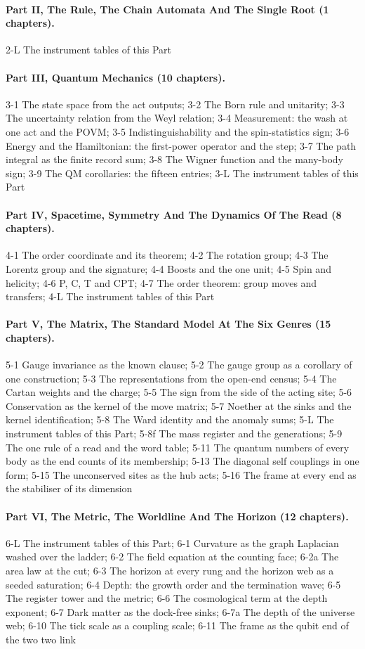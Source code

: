 \paragraph{Part II, The Rule, The Chain Automata And The Single Root (1 chapters).} 2-L The instrument tables of this Part
\paragraph{Part III, Quantum Mechanics (10 chapters).} 3-1 The state space from the act outputs; 3-2 The Born rule and unitarity; 3-3 The uncertainty relation from the Weyl relation; 3-4 Measurement: the wash at one act and the POVM; 3-5 Indistinguishability and the spin-statistics sign; 3-6 Energy and the Hamiltonian: the first-power operator and the step; 3-7 The path integral as the finite record sum; 3-8 The Wigner function and the many-body sign; 3-9 The QM corollaries: the fifteen entries; 3-L The instrument tables of this Part
\paragraph{Part IV, Spacetime, Symmetry And The Dynamics Of The Read (8 chapters).} 4-1 The order coordinate and its theorem; 4-2 The rotation group; 4-3 The Lorentz group and the signature; 4-4 Boosts and the one unit; 4-5 Spin and helicity; 4-6 P, C, T and CPT; 4-7 The order theorem: group moves and transfers; 4-L The instrument tables of this Part
\paragraph{Part V, The Matrix, The Standard Model At The Six Genres (15 chapters).} 5-1 Gauge invariance as the known clause; 5-2 The gauge group as a corollary of one construction; 5-3 The representations from the open-end census; 5-4 The Cartan weights and the charge; 5-5 The sign from the side of the acting site; 5-6 Conservation as the kernel of the move matrix; 5-7 Noether at the sinks and the kernel identification; 5-8 The Ward identity and the anomaly sums; 5-L The instrument tables of this Part; 5-8f The mass register and the generations; 5-9 The one rule of a read and the word table; 5-11 The quantum numbers of every body as the end counts of its membership; 5-13 The diagonal self couplings in one form; 5-15 The unconserved sites as the hub acts; 5-16 The frame at every end as the stabiliser of its dimension
\paragraph{Part VI, The Metric, The Worldline And The Horizon (12 chapters).} 6-L The instrument tables of this Part; 6-1 Curvature as the graph Laplacian washed over the ladder; 6-2 The field equation at the counting face; 6-2a The area law at the cut; 6-3 The horizon at every rung and the horizon web as a seeded saturation; 6-4 Depth: the growth order and the termination wave; 6-5 The register tower and the metric; 6-6 The cosmological term at the depth exponent; 6-7 Dark matter as the dock-free sinks; 6-7a The depth of the universe web; 6-10 The tick scale as a coupling scale; 6-11 The frame as the qubit end of the two two link
